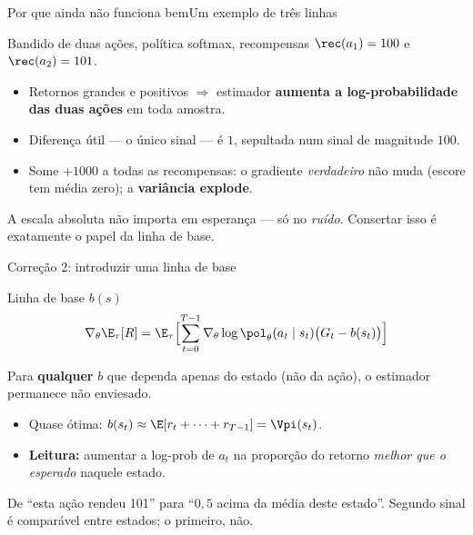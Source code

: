 \documentclass[aspectratio=169, 11pt]{beamer}
\newcommand{\thv}{\theta}                       %
\newcommand{\polth}{\pol_{\thv}}                %
\newcommand{\gth}{\nabla_{\thv}}                %
\newcommand{\traj}{\tau}                        %
\begin{document}
\begin{frame}{Por que ainda não funciona bem}{Um exemplo de três linhas}

  Bandido de duas ações, política softmax, recompensas
  $\rec(a_1) = 100$ e $\rec(a_2) = 101$.

  \begin{itemize}\setlength{\itemsep}{0.35ex}
    \item Retornos grandes e positivos $\Rightarrow$ estimador \textbf{aumenta
      a log-probabilidade das duas ações} em toda amostra.
    \item Diferença útil --- o único sinal --- é $1$, sepultada num sinal de
      magnitude $100$.
    \item Some $+1000$ a todas as recompensas: o gradiente \emph{verdadeiro}
      não muda (escore tem média zero); a \textbf{variância explode}.
  \end{itemize}

  \begin{ideiabox}
    A escala absoluta não importa em esperança --- só no \emph{ruído}.
    Consertar isso é exatamente o papel da linha de base.
  \end{ideiabox}
\end{frame}

\begin{frame}{Correção 2: introduzir uma linha de base}

  \begin{defbox}{Linha de base $b(s)$}
    \vspace{-0.9em}
    \[
      \gth \E_{\traj}[R] = \E_{\traj}\Bigl[\sum_{t=0}^{T-1}
        \gth \log \polth(a_t\mid s_t)\bigl(G_t - b(s_t)\bigr)\Bigr]
    \]
    \vspace{-0.9em}

    Para \textbf{qualquer} $b$ que dependa apenas do estado (não da ação), o
    estimador permanece não enviesado.
  \end{defbox}

  \begin{itemize}\setlength{\itemsep}{0.35ex}
    \item Quase ótima: $b(s_t) \approx \E[r_t + \dots + r_{T-1}] = \Vpi(s_t)$.
    \item \textbf{Leitura:} aumentar a log-prob de $a_t$ na proporção do
      retorno \emph{melhor que o esperado} naquele estado.
  \end{itemize}

  \begin{ideiabox}
    De ``esta ação rendeu 101'' para ``$0{,}5$ acima da média deste estado''.
    Segundo sinal é comparável entre estados; o primeiro, não.
  \end{ideiabox}
\end{frame}
\end{document}
